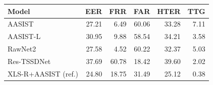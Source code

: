 \begin{tabular}{@{}lrrrrr@{}}
\toprule
Model & EER & FRR & FAR & HTER & TTG \\
\midrule
AASIST & 27.21 & 6.49 & 60.06 & 33.28 & 7.11 \\
AASIST-L & 30.95 & 9.88 & 58.54 & 34.21 & 3.58 \\
RawNet2 & 27.58 & 4.52 & 60.22 & 32.37 & 5.03 \\
Res-TSSDNet & 37.69 & 60.78 & 18.42 & 39.60 & 2.02 \\
XLS-R+AASIST (ref.) & 24.80 & 18.75 & 31.49 & 25.12 & 0.38 \\
\bottomrule
\end{tabular}
